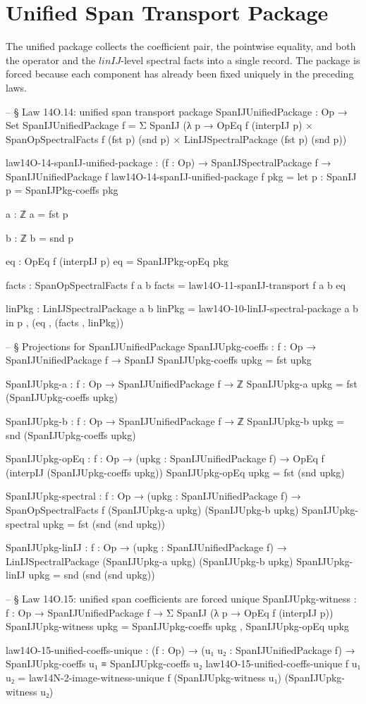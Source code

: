 \documentclass[11pt,a4paper]{book}
\def\texttt#1{#1}%
\begin{document}
\section{Unified Span Transport Package}

The unified package collects the coefficient pair, the
pointwise equality, and both the operator and the
$\texttt{linIJ}$-level spectral facts into a single record.  The package is
forced because each component has already been fixed uniquely in the preceding
laws.

\begin{code}
-- § Law 14O.14: unified span transport package
SpanIJUnifiedPackage : Op → Set
SpanIJUnifiedPackage f =
  Σ SpanIJ (λ p →
    OpEq f (interpIJ p) ×
    SpanOpSpectralFacts f (fst p) (snd p) ×
    LinIJSpectralPackage (fst p) (snd p))

law14O-14-spanIJ-unified-package : (f : Op) → SpanIJSpectralPackage f → SpanIJUnifiedPackage f
law14O-14-spanIJ-unified-package f pkg =
  let
    p : SpanIJ
    p = SpanIJPkg-coeffs pkg

    a : ℤ
    a = fst p

    b : ℤ
    b = snd p

    eq : OpEq f (interpIJ p)
    eq = SpanIJPkg-opEq pkg

    facts : SpanOpSpectralFacts f a b
    facts = law14O-11-spanIJ-transport f a b eq

    linPkg : LinIJSpectralPackage a b
    linPkg = law14O-10-linIJ-spectral-package a b
  in
  p , (eq , (facts , linPkg))

-- § Projections for SpanIJUnifiedPackage
SpanIJUpkg-coeffs : {f : Op} → SpanIJUnifiedPackage f → SpanIJ
SpanIJUpkg-coeffs upkg = fst upkg

SpanIJUpkg-a : {f : Op} → SpanIJUnifiedPackage f → ℤ
SpanIJUpkg-a upkg = fst (SpanIJUpkg-coeffs upkg)

SpanIJUpkg-b : {f : Op} → SpanIJUnifiedPackage f → ℤ
SpanIJUpkg-b upkg = snd (SpanIJUpkg-coeffs upkg)

SpanIJUpkg-opEq : {f : Op} → (upkg : SpanIJUnifiedPackage f) → OpEq f (interpIJ (SpanIJUpkg-coeffs upkg))
SpanIJUpkg-opEq upkg = fst (snd upkg)

SpanIJUpkg-spectral : {f : Op} → (upkg : SpanIJUnifiedPackage f) → SpanOpSpectralFacts f (SpanIJUpkg-a upkg) (SpanIJUpkg-b upkg)
SpanIJUpkg-spectral upkg = fst (snd (snd upkg))

SpanIJUpkg-linIJ : {f : Op} → (upkg : SpanIJUnifiedPackage f) → LinIJSpectralPackage (SpanIJUpkg-a upkg) (SpanIJUpkg-b upkg)
SpanIJUpkg-linIJ upkg = snd (snd (snd upkg))

-- § Law 14O.15: unified span coefficients are forced unique
SpanIJUpkg-witness : {f : Op} → SpanIJUnifiedPackage f → Σ SpanIJ (λ p → OpEq f (interpIJ p))
SpanIJUpkg-witness upkg = SpanIJUpkg-coeffs upkg , SpanIJUpkg-opEq upkg

law14O-15-unified-coeffs-unique : (f : Op) → (u₁ u₂ : SpanIJUnifiedPackage f) → SpanIJUpkg-coeffs u₁ ≡ SpanIJUpkg-coeffs u₂
law14O-15-unified-coeffs-unique f u₁ u₂ =
  law14N-2-image-witness-unique f (SpanIJUpkg-witness u₁) (SpanIJUpkg-witness u₂)
\end{code}
\end{document}

